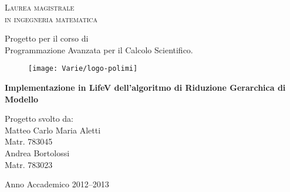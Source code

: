 \begin{titlepage}
\begin{center}
    { \scshape 
    Laurea magistrale\\
    in ingegneria matematica\\
    }
\end{center}
\vspace{1.2cm}
\begin{flushleft}
		\Large
		Progetto per il corso di \\
		Programmazione Avanzata per il Calcolo Scientifico.\\
		\vspace{1.5cm}
\end{flushleft}
\begin{figure}[h]
		\centering
		\texttt{[image: Varie/logo-polimi]}
		\vspace{1cm}
\end{figure}
\begin{center}
{ \bfseries  {\Large Implementazione in LifeV dell'algoritmo di Riduzione Gerarchica di Modello}\\
\vspace{0.2cm} }
\end{center}
\vspace{0.4cm}
\begin{flushright}
		\Large
		Progetto svolto da:\\
		Matteo Carlo Maria Aletti\\
		Matr. 783045\\
		Andrea Bortolossi\\
		Matr. 783023\\
		\vspace{1.5cm}
\end{flushright}
\begin{center}
Anno Accademico 2012--2013
\end{center}

\end{titlepage}